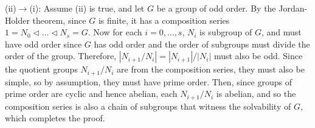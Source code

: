 \documentclass{article}
\begin{document}
\begin{enumerate}
    (ii)$\rightarrow$(i): Assume (ii) is true, and let $G$ be a group of
    odd order. By the Jordan-Holder theorem, since $G$ is finite, it has a
    composition series $1=N_0\triangleleft\ldots\triangleleft N_s=G$. Now
    for each $i=0,\ldots,s$, $N_i$ is subgroup of $G$, and must have odd
    order since $G$ has odd order and the order of subgroups must divide
    the order of the group. Therefore, $|N_{i+1}/N_{i}|=|N_{i+1}|/|N_i|$
    must also be odd. Since the quotient groups $N_{i+1}/N_{i}$ are from
    the composition series, they must also be simple, so by assumption,
    they must have prime order. Then, since groups of prime order are
    cyclic and hence abelian, each $N_{i+1}/N_{i}$ is abelian, and so the
    composition series is also a chain of subgroups that witness the
    solvability of $G$, which completes the proof.
\end{enumerate}
\end{document}
